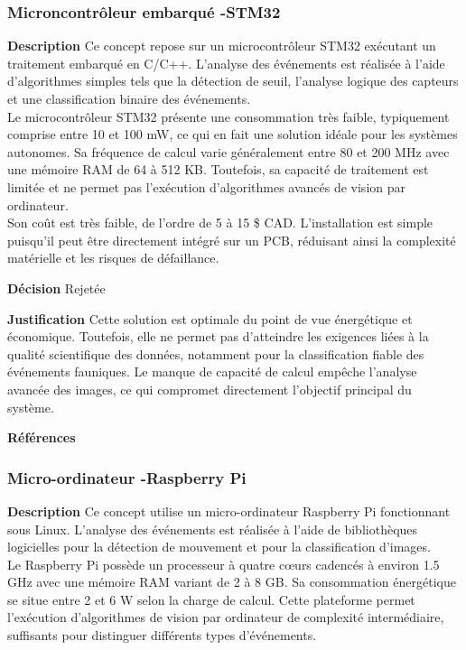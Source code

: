 \subsubsection{Microncontrôleur embarqué -STM32}
\label{sec:stm32}
\noindent\textbf{Description} Ce concept repose sur un microcontrôleur STM32 exécutant un traitement embarqué en C/C++. L’analyse des événements est réalisée à l’aide d’algorithmes simples tels que la détection de seuil, l’analyse logique des capteurs et une classification binaire des événements.
\\

Le microcontrôleur STM32 présente une consommation très faible, typiquement comprise entre 10 et 100 mW, ce qui en fait une solution idéale pour les systèmes autonomes. Sa fréquence de calcul varie généralement entre 80 et 200 MHz avec une mémoire RAM de 64 à 512 KB. Toutefois, sa capacité de traitement est limitée et ne permet pas l’exécution d’algorithmes avancés de vision par ordinateur.
\\

Son coût est très faible, de l’ordre de 5 à 15 \$ CAD. L’installation est simple puisqu’il peut être directement intégré sur un PCB, réduisant ainsi la complexité matérielle et les risques de défaillance.
\smallskip


\noindent\textbf{Décision} Rejetée
\smallskip

\noindent\textbf{Justification} Cette solution est optimale du point de vue énergétique et économique. Toutefois, elle ne permet pas d’atteindre les exigences liées à la qualité scientifique des données, notamment pour la classification fiable des événements fauniques. Le manque de capacité de calcul empêche l’analyse avancée des images, ce qui compromet directement l’objectif principal du système.
\smallskip

\noindent\textbf{Références}
\cite{STM321}
\cite{STM322}
\cite{STM323}

\subsubsection{Micro-ordinateur -Raspberry Pi}
\label{sec:raspb}
\noindent\textbf{Description} Ce concept utilise un micro-ordinateur Raspberry Pi fonctionnant sous Linux. L’analyse des événements est réalisée à l’aide de bibliothèques logicielles pour la détection de mouvement et pour la classification d’images.
\\

Le Raspberry Pi possède un processeur à quatre cœurs cadencés à environ 1.5 GHz avec une mémoire RAM variant de 2 à 8 GB. Sa consommation énergétique se situe entre 2 et 6 W selon la charge de calcul. Cette plateforme permet l’exécution d’algorithmes de vision par ordinateur de complexité intermédiaire, suffisants pour distinguer différents types d’événements.
\\


